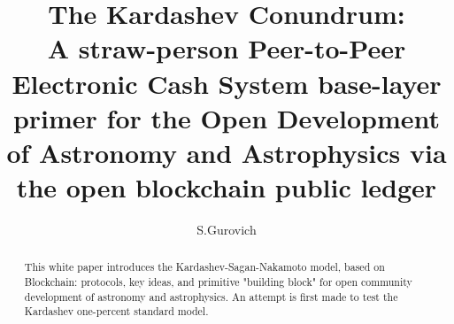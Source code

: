 \documentclass[final,5p,times,twocolumn,authoryear]{elsarticle}
\begin{document}
\begin{frontmatter}

\title{The Kardashev Conundrum:\\ A straw-person Peer-to-Peer Electronic Cash System base-layer primer for the Open Development of Astronomy and Astrophysics via the open blockchain public ledger}
 
    \author[iate,wsu]{S.Gurovich}
  
\address[iate]{
   Instituto De Astronom\'ia Te\'orica y Experimental -
   Observatorio Astron\'omico C\'ordoba (IATE--OAC--UNC--CONICET),
   Laprida 854, X5000BGR, C\'ordoba, Argentina}
\address[wsu]{
   Western Sydney University, Kingswood campus, NSW, Australia (visiting fellow 2019-2020)
}

\begin{abstract}
This white paper introduces the Kardashev-Sagan-Nakamoto model, based on Blockchain: protocols, key ideas, and primitive "building block" for open community development of astronomy and astrophysics. An attempt is first made to test the Kardashev one-percent standard model.   


\end{abstract}
\end{frontmatter}
\end{document}
